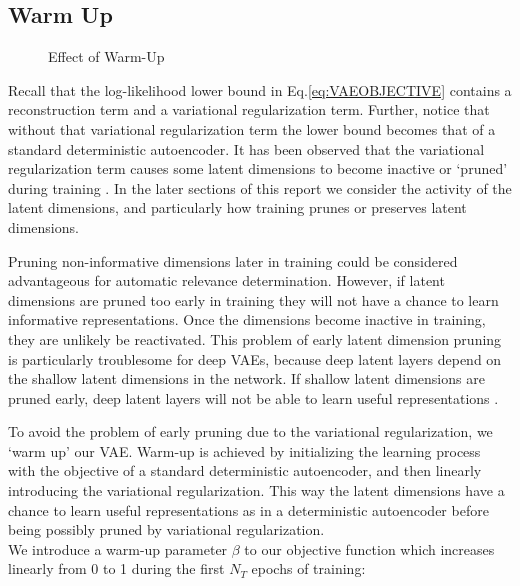 \documentclass{article} %
\begin{document}
\subsection{Warm Up}
\begin{wrapfigure}{l}{0.5\textwidth}
    \resizebox{\linewidth}{!}{}
    \caption{Effect of Warm-Up}
    \label{fig:wucost}
\end{wrapfigure}
%
Recall that the log-likelihood lower bound in Eq.\ref{eq:VAEOBJECTIVE} contains a reconstruction term and a variational regularization term. Further, notice that without that variational regularization term the lower bound becomes that of a standard deterministic autoencoder. It has been observed that the variational regularization term causes some latent dimensions to become inactive or `pruned' during training \cite{MacKay2001, Burda2016}. In the later sections of this report we consider the activity of the latent dimensions, and particularly how training prunes or preserves latent dimensions.
\par Pruning non-informative dimensions later in training could be considered advantageous for automatic relevance determination. However, if latent dimensions are pruned too early in training they will not have a chance to learn informative representations. Once the dimensions become inactive in training, they are unlikely be reactivated. This problem of early latent dimension pruning is particularly troublesome for deep VAEs, because deep latent layers depend on the shallow latent dimensions in the network. If shallow latent dimensions are pruned early,  deep latent layers will not be able to learn useful representations \cite{Sonderby2016}.
\par To avoid the problem of early pruning due to the variational regularization, we `warm up' our VAE. Warm-up is achieved by initializing the learning process with the objective of a standard deterministic autoencoder, and then linearly introducing the variational regularization. This way the latent dimensions have a chance to learn useful representations as in a deterministic autoencoder before being possibly pruned by variational regularization.\\ We introduce a warm-up parameter $\beta$ to our objective function which increases linearly from 0 to 1 during the first $N_T$ epochs of training:
\end{document}
